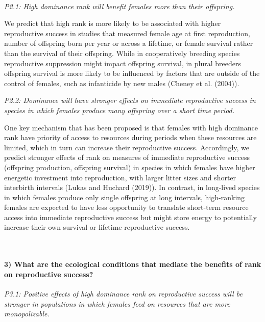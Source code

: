 \documentclass[
]{article}
\begin{document}
~

\emph{P2.1: High dominance rank will benefit females more than their
offspring.}

We predict that high rank is more likely to be associated with higher
reproductive success in studies that measured female age at first
reproduction, number of offspring born per year or across a lifetime, or
female survival rather than the survival of their offspring. While in
cooperatively breeding species reproductive suppression might impact
offspring survival, in plural breeders offspring survival is more likely
to be influenced by factors that are outside of the control of females,
such as infanticide by new males (Cheney et al. (2004)).

\emph{P2.2: Dominance will have stronger effects on immediate
reproductive success in species in which females produce many offspring
over a short time period.}

One key mechanism that has been proposed is that females with high
dominance rank have priority of access to resources during periods when
these resources are limited, which in turn can increase their
reproductive success. Accordingly, we predict stronger effects of rank
on measures of immediate reproductive success (offspring production,
offspring survival) in species in which females have higher energetic
investment into reproduction, with larger litter sizes and shorter
interbirth intervals (Lukas and Huchard (2019)). In contrast, in
long-lived species in which females produce only single offspring at
long intervals, high-ranking females are expected to have less
opportunity to translate short-term resource access into immediate
reproductive success but might store energy to potentially increase
their own survival or lifetime reproductive success.

~

\hypertarget{what-are-the-ecological-conditions-that-mediate-the-benefits-of-rank-on-reproductive-success-1}{%
\paragraph{\texorpdfstring{\textbf{3) What are the ecological conditions
that mediate the benefits of rank on reproductive
success?}}{3) What are the ecological conditions that mediate the benefits of rank on reproductive success?}}\label{what-are-the-ecological-conditions-that-mediate-the-benefits-of-rank-on-reproductive-success-1}}

\emph{P3.1: Positive effects of high dominance rank on reproductive
success will be stronger in populations in which females feed on
resources that are more monopolizable.}
\end{document}
